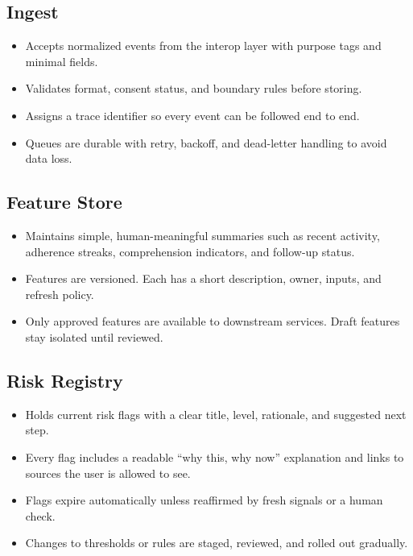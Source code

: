 \documentclass[12pt]{article}
\begin{document}
\subsection*{Ingest}
\begin{itemize}[leftmargin=*]
  \item Accepts normalized events from the interop layer with purpose tags and minimal fields.
  \item Validates format, consent status, and boundary rules before storing.
  \item Assigns a trace identifier so every event can be followed end to end.
  \item Queues are durable with retry, backoff, and dead-letter handling to avoid data loss.
\end{itemize}

\subsection*{Feature Store}
\begin{itemize}[leftmargin=*]
  \item Maintains simple, human-meaningful summaries such as recent activity, adherence streaks, comprehension indicators, and follow-up status.
  \item Features are versioned. Each has a short description, owner, inputs, and refresh policy.
  \item Only approved features are available to downstream services. Draft features stay isolated until reviewed.
\end{itemize}

\subsection*{Risk Registry}
\begin{itemize}[leftmargin=*]
  \item Holds current risk flags with a clear title, level, rationale, and suggested next step.
  \item Every flag includes a readable “why this, why now” explanation and links to sources the user is allowed to see.
  \item Flags expire automatically unless reaffirmed by fresh signals or a human check.
  \item Changes to thresholds or rules are staged, reviewed, and rolled out gradually.
\end{itemize}
\end{document}
